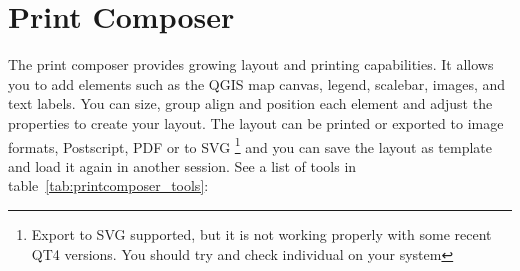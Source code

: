 
\section{Print Composer}\label{label_printcomposer}


The print composer provides growing layout and printing
capabilities. It allows you to add elements such as the QGIS map canvas, 
legend, scalebar, images, and text labels. You can size, group 
align and position each element and adjust the properties to create your
layout. The layout can be printed or exported to image formats, Postscript,
PDF or to SVG \footnote{Export to SVG supported, but it is not working
properly with some recent QT4 versions. You should try and
check individual on your system} and you can save the layout as template and
load it again in another session. See a list of tools in
table~\ref{tab:printcomposer_tools}:

